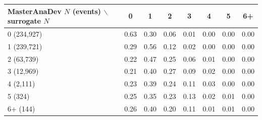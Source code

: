 \begin{tabular}{lccccccc}
\toprule
MasterAnaDev $N$ (events) $\backslash$ surrogate $N$ & 0 & 1 & 2 & 3 & 4 & 5 & 6+ \\
\midrule
0 (234,927) & 0.63 & 0.30 & 0.06 & 0.01 & 0.00 & 0.00 & 0.00 \\
1 (239,721) & 0.29 & 0.56 & 0.12 & 0.02 & 0.00 & 0.00 & 0.00 \\
2 (63,739) & 0.22 & 0.47 & 0.25 & 0.06 & 0.01 & 0.00 & 0.00 \\
3 (12,969) & 0.21 & 0.40 & 0.27 & 0.09 & 0.02 & 0.00 & 0.00 \\
4 (2,111) & 0.23 & 0.39 & 0.24 & 0.11 & 0.03 & 0.00 & 0.00 \\
5 (324) & 0.25 & 0.35 & 0.23 & 0.13 & 0.02 & 0.01 & 0.00 \\
6+ (144) & 0.26 & 0.40 & 0.20 & 0.11 & 0.01 & 0.01 & 0.00 \\
\bottomrule
\end{tabular}
